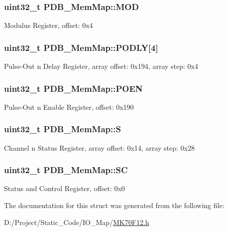 \subsubsection[{M\+O\+D}]{\setlength{\rightskip}{0pt plus 5cm}uint32\+\_\+t P\+D\+B\+\_\+\+Mem\+Map\+::\+M\+O\+D}\label{struct_p_d_b___mem_map_a01bd648b1caa9b6626636fce386b496d}
Modulus Register, offset\+: 0x4 \hypertarget{struct_p_d_b___mem_map_a69081c41b606ea7a699a67e266a785d5}{}
\subsubsection[{P\+O\+D\+L\+Y}]{\setlength{\rightskip}{0pt plus 5cm}uint32\+\_\+t P\+D\+B\+\_\+\+Mem\+Map\+::\+P\+O\+D\+L\+Y\mbox{[}4\mbox{]}}\label{struct_p_d_b___mem_map_a69081c41b606ea7a699a67e266a785d5}
Pulse-\/\+Out n Delay Register, array offset\+: 0x194, array step\+: 0x4 \hypertarget{struct_p_d_b___mem_map_a259dc7b16cc8f12022cb6a5befb1660c}{}
\subsubsection[{P\+O\+E\+N}]{\setlength{\rightskip}{0pt plus 5cm}uint32\+\_\+t P\+D\+B\+\_\+\+Mem\+Map\+::\+P\+O\+E\+N}\label{struct_p_d_b___mem_map_a259dc7b16cc8f12022cb6a5befb1660c}
Pulse-\/\+Out n Enable Register, offset\+: 0x190 \hypertarget{struct_p_d_b___mem_map_afbd33089148cbb97dedff82c1c91c46d}{}
\subsubsection[{S}]{\setlength{\rightskip}{0pt plus 5cm}uint32\+\_\+t P\+D\+B\+\_\+\+Mem\+Map\+::\+S}\label{struct_p_d_b___mem_map_afbd33089148cbb97dedff82c1c91c46d}
Channel n Status Register, array offset\+: 0x14, array step\+: 0x28 \hypertarget{struct_p_d_b___mem_map_a10fb0324a394cc747b6f7d8b4c811b57}{}
\subsubsection[{S\+C}]{\setlength{\rightskip}{0pt plus 5cm}uint32\+\_\+t P\+D\+B\+\_\+\+Mem\+Map\+::\+S\+C}\label{struct_p_d_b___mem_map_a10fb0324a394cc747b6f7d8b4c811b57}
Status and Control Register, offset\+: 0x0 

The documentation for this struct was generated from the following file\+:\begin{DoxyCompactItemize}
\item 
D\+:/\+Project/\+Static\+\_\+\+Code/\+I\+O\+\_\+\+Map/\hyperlink{_m_k70_f12_8h}{M\+K70\+F12.\+h}\end{DoxyCompactItemize}
